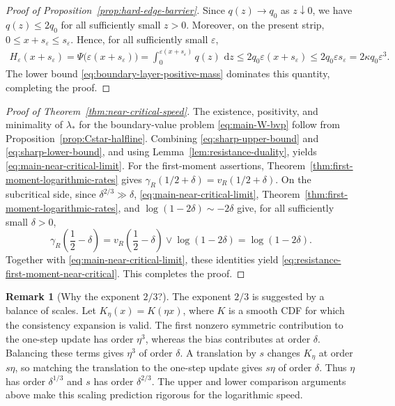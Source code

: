 \documentclass[12pt]{amsart}
\numberwithin{equation}{section}
\theoremstyle{plain}
\theoremstyle{definition}
\newtheorem{remark}[theorem]{Remark}
\newcommand{\dd}{\,\mathrm d}
\begin{document}
\begin{proof}[Proof of Proposition~\ref{prop:hard-edge-barrier}]
Since $q(z)\to q_0$ as $z\downarrow0$, we have
$q(z)\le2q_0$ for all sufficiently small $z>0$.  Moreover, on the
present strip, $0\le x+s_\varepsilon\le s_\varepsilon$.  Hence, for all
sufficiently small $\varepsilon$,
\[
\begin{aligned}
 H_\varepsilon(x+s_\varepsilon)
 =\Psi\bigl(\varepsilon(x+s_\varepsilon)\bigr)
 =\int_0^{\varepsilon(x+s_\varepsilon)}q(z)\,\dd z
 \le2q_0\varepsilon(x+s_\varepsilon)
 \le2q_0\varepsilon s_\varepsilon
 =2\kappa q_0\varepsilon^3.
\end{aligned}
\]
  The lower bound
\eqref{eq:boundary-layer-positive-mass} dominates this quantity, completing
the proof.
\end{proof}


\begin{proof}[Proof of Theorem~\ref{thm:near-critical-speed}]
The existence, positivity, and minimality of $\lambda_*$ for the
boundary-value problem \eqref{eq:main-W-bvp} follow from
Proposition~\ref{prop:Cstar-halfline}.
  Combining \eqref{eq:sharp-upper-bound} and
\eqref{eq:sharp-lower-bound}, and using
Lemma~\ref{lem:resistance-duality}, yields
\eqref{eq:main-near-critical-limit}.
For the first-moment assertions, Theorem~\ref{thm:first-moment-logarithmic-rates}
gives
$\gamma_R(1/2+\delta)=v_R(1/2+\delta)$.  On the subcritical side, since
$\delta^{2/3}\gg\delta$, \eqref{eq:main-near-critical-limit},
Theorem~\ref{thm:first-moment-logarithmic-rates}, and
$\log(1-2\delta)\sim-2\delta$ give, for all sufficiently small $\delta>0$,
\[
 \gamma_R\left(\frac12-\delta\right)
 =v_R\left(\frac12-\delta\right)\vee\log(1-2\delta)
 =\log(1-2\delta).
\]
Together with \eqref{eq:main-near-critical-limit}, these identities yield
\eqref{eq:resistance-first-moment-near-critical}.  This completes the proof.
\end{proof}


\begin{remark}[Why the exponent $2/3$?]
\label{rem:two-thirds-heuristic}
The exponent $2/3$ is suggested by a balance of scales. Let
$K_\eta(x)=K(\eta x)$, where $K$ is a smooth CDF for which the consistency
expansion is valid. The first nonzero symmetric contribution to the one-step
update has order $\eta^3$, whereas the bias contributes at order $\delta$.
Balancing these terms gives $\eta^3$ of order $\delta$. A translation by $s$
changes $K_\eta$ at order $s\eta$, so matching the translation to the one-step
update gives $s\eta$ of order $\delta$. Thus $\eta$ has order
$\delta^{1/3}$ and $s$ has order $\delta^{2/3}$. The upper and lower comparison
arguments above make this scaling prediction rigorous for the logarithmic speed.
\end{remark}
\end{document}
